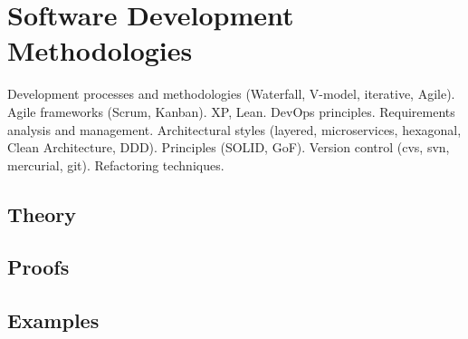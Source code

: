 
\section{Software Development Methodologies}
\label{sec:2.3b.12-sdlc-methodologies}

\begin{ticket}
Development processes and methodologies (Waterfall, V-model, iterative, Agile). Agile frameworks (Scrum, Kanban). XP, Lean. DevOps principles. Requirements analysis and management. Architectural styles (layered, microservices, hexagonal, Clean Architecture, DDD). Principles (SOLID, GoF). Version control (cvs, svn, mercurial, git). Refactoring techniques.
\end{ticket}

\subsection*{Theory}

\subsection*{Proofs}

\subsection*{Examples}
